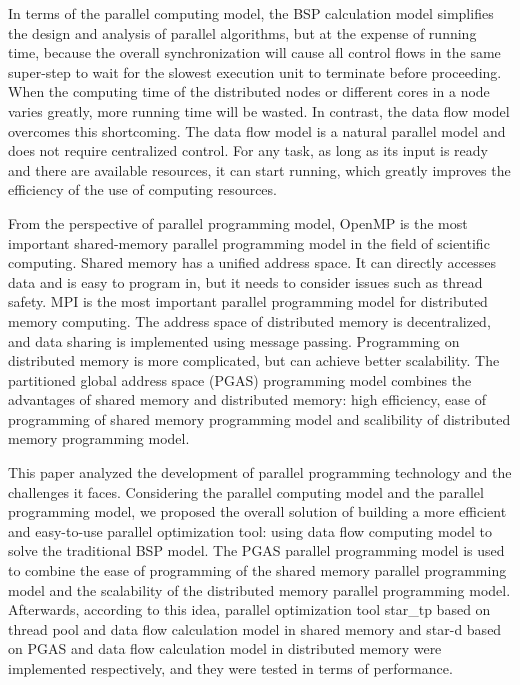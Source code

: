 In terms of the parallel computing model, the BSP calculation model simplifies the design and analysis of parallel algorithms, but at the expense of running time, because the overall synchronization will cause all control flows in the same super-step to wait for the slowest execution unit to terminate before proceeding. When the computing time of the distributed nodes or different cores in a node varies greatly, more running time will be wasted. In contrast, the data flow model overcomes this shortcoming. The data flow model is a natural parallel model and does not require centralized control. For any task, as long as its input is ready and there are available resources, it can start running, which greatly improves the efficiency of the use of computing resources.

From the perspective of parallel programming model, OpenMP is the most important shared-memory parallel programming model in the field of scientific computing. Shared memory has a unified address space. It can directly accesses data and is easy to program in, but it needs to consider issues such as thread safety. MPI is the most important parallel programming model for distributed memory computing. The address space of distributed memory is decentralized, and data sharing is implemented using message passing. Programming on distributed memory is more complicated, but can achieve better scalability. The partitioned global address space (PGAS) programming model combines the advantages of shared memory and distributed memory: high efficiency, ease of programming of shared memory programming model and scalibility of distributed memory programming model.

This paper analyzed the development of parallel programming technology and the challenges it faces. Considering the parallel computing model and the parallel programming model, we proposed the overall solution of building a more efficient and easy-to-use parallel optimization tool: using data flow computing model to solve the traditional BSP model. The PGAS parallel programming model is used to combine the ease of programming of the shared memory parallel programming model and the scalability of the distributed memory parallel programming model. Afterwards, according to this idea, parallel optimization tool star\_tp based on thread pool and data flow calculation model in shared memory and star-d based on PGAS and data flow calculation model in distributed memory were implemented respectively, and they were tested in terms of performance.

